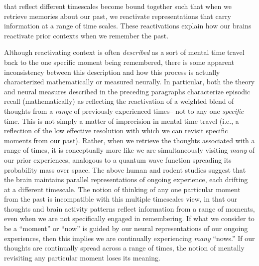 \documentclass{article}
\begin{document}
that reflect different timescales become bound together such that when we retrieve memories about our past, we reactivate representations that carry information at a range of time scales.  These reactivations explain how our brains reactivate prior contexts when we remember the past.

Although reactivating context is often \textit{described} as a sort of mental time travel back to the one specific moment being remembered, there is some apparent inconsistency between this description and how this process is actually characterized mathematically or measured neurally.  In particular, both the theory and neural measures described in the preceding paragraphs characterize episodic recall (mathematically) as reflecting the reactivation of a weighted blend of thoughts from a \textit{range} of previously experienced times-- not to any one \textit{specific} time.  This is not simply a matter of imprecision in mental time travel (i.e., a reflection of the low effective resolution with which we can revisit specific moments from our past).  Rather, when we retrieve the thoughts associated with a range of times, it is conceptually more like we are simultaneously visiting \textit{many} of our prior experiences, analogous to a quantum wave function spreading its probability mass over space. The above human and rodent studies suggest that the brain maintains parallel representations of ongoing experience, each drifting at a different timescale.  The notion of thinking of any one particular moment from the past is incompatible with this multiple timescales view, in that our thoughts and brain activity patterns reflect information from a range of moments, even when we are not specifically engaged in remembering.  If what we consider to be a ``moment'' or ``now'' is guided by our neural representations of our ongoing experiences, then this implies we are continually experiencing \textit{many} ``nows.''  If our thoughts are continually spread across a range of times, the notion of mentally revisiting any particular moment loses its meaning.
\end{document}
